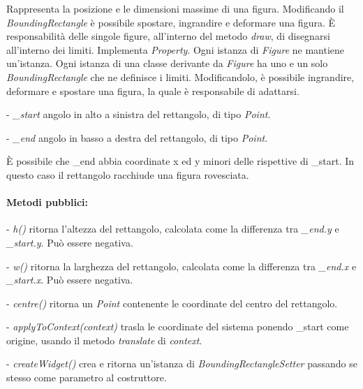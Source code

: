 Rappresenta la posizione e le dimensioni massime di una figura. Modificando il
\textit{BoundingRectangle} \`e possibile spostare, ingrandire e deformare una figura.
\`E responsabilit\`a delle singole figure, all'interno del metodo \textit{draw}, di disegnarsi all'interno dei limiti.
Implementa \textit{Property}. Ogni istanza di \textit{Figure} ne mantiene un'istanza.
Ogni istanza di una classe derivante da \textit{Figure} ha uno e un solo \textit{BoundingRectangle} che ne definisce i limiti. Modificandolo, \`e possibile ingrandire, deformare e spostare una figura, la quale \`e responsabile di adattarsi.
\begin{elencopuntato}[\subsubsecindent]
\item[-] \textit{{\_}start} angolo in alto a sinistra del rettangolo, di tipo \textit{Point}.
\item[-] \textit{{\_}end} angolo in basso a destra del rettangolo, di tipo \textit{Point}.
\end{elencopuntato}
\`E possibile che {\_}end abbia coordinate x ed y minori delle rispettive di {\_}start. In questo caso il rettangolo racchiude una figura rovesciata.
\paragraph{Metodi pubblici:}
\begin{elencopuntato}[\subsubsecindent]
\item[-] \textit{h()} ritorna l'altezza del rettangolo, calcolata come la differenza tra \textit{{\_}end.y} e \textit{{\_}start.y}. Pu\`o essere negativa.
\item[-] \textit{w()} ritorna la larghezza del rettangolo, calcolata come la differenza tra \textit{{\_}end.x} e \textit{{\_}start.x}. Pu\`o essere negativa.
\item[-] \textit{centre()} ritorna un \textit{Point} contenente le coordinate del centro del rettangolo.
\item[-] \textit{applyToContext(context)} trasla le coordinate del sistema ponendo {\_}start come origine, usando il metodo \textit{translate} di \textit{context}.
\item[-] \textit{createWidget()} crea e ritorna un'istanza di \textit{BoundingRectangleSetter} passando se stesso come parametro al costruttore.
\end{elencopuntato}

